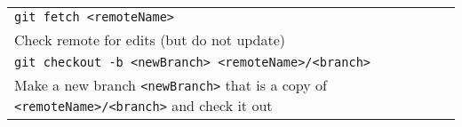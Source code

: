 \documentclass[11pt]{article}
\begin{document}
{\begin{center}
\begin{tabular}{|l|}
\quad \texttt{git fetch <remoteName>}\\
\quad \quad Check remote for edits (but do not update)\\
\quad \texttt{git checkout -b <newBranch> <remoteName>/<branch>}\\
\quad \quad Make a new branch \texttt{<newBranch>} that is a copy of \texttt{<remoteName>/<branch>} and check it out\\
\hline

\end{tabular}
\end{center}
}


\restoregeometry
\end{document}
